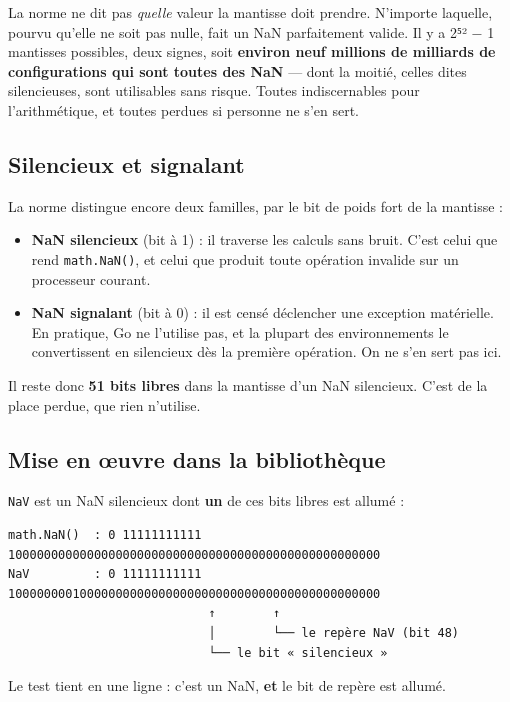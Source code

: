 \documentclass[11pt,a4paper]{report}
\providecommand{\tightlist}{\setlength{\itemsep}{0pt}\setlength{\parskip}{0pt}}
\begin{document}
La norme ne dit pas \emph{quelle} valeur la mantisse doit prendre.
N'importe laquelle, pourvu qu'elle ne soit pas nulle, fait un NaN
parfaitement valide. Il y a 2⁵² − 1 mantisses possibles, deux signes,
soit \textbf{environ neuf millions de milliards de configurations qui
sont toutes des NaN} --- dont la moitié, celles dites silencieuses, sont
utilisables sans risque. Toutes indiscernables pour l'arithmétique, et
toutes perdues si personne ne s'en sert.

\subsection{Silencieux et signalant}\label{sec:quiet}

La norme distingue encore deux familles, par le bit de poids fort de la
mantisse :

\begin{itemize}
\tightlist
\item
  \textbf{NaN silencieux} (bit à 1) : il traverse les calculs sans
  bruit. C'est celui que rend \texttt{math.NaN()}, et celui que produit
  toute opération invalide sur un processeur courant.
\item
  \textbf{NaN signalant} (bit à 0) : il est censé déclencher une
  exception matérielle. En pratique, Go ne l'utilise pas, et la plupart
  des environnements le convertissent en silencieux dès la première
  opération. On ne s'en sert pas ici.
\end{itemize}

Il reste donc \textbf{51 bits libres} dans la mantisse d'un NaN
silencieux. C'est de la place perdue, que rien n'utilise.

\subsection{Mise en œuvre dans la bibliothèque}

\texttt{NaV} est un NaN silencieux dont \textbf{un} de ces bits libres
est allumé :

\begin{verbatim}
math.NaN()  : 0 11111111111 1000000000000000000000000000000000000000000000000000
NaV         : 0 11111111111 1000000001000000000000000000000000000000000000000000
                            ↑        ↑
                            │        └── le repère NaV (bit 48)
                            └── le bit « silencieux »
\end{verbatim}

Le test tient en une ligne : c'est un NaN, \textbf{et} le bit de repère
est allumé.
\end{document}
